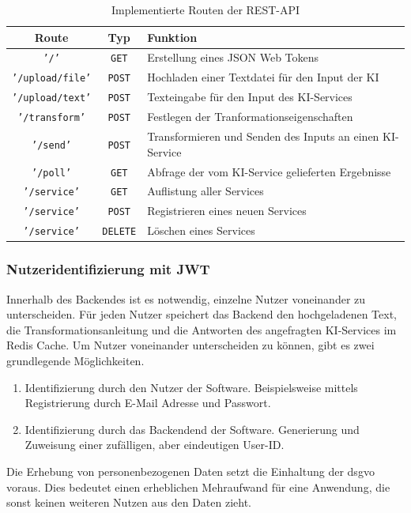 \begin{table}[H]
\centering
\begin{tabular}{c|c|l}
\textbf{Route} & \textbf{Typ} & \textbf{Funktion}\\
\hline
\texttt{'/'} & \texttt{GET} & Erstellung eines JSON Web Tokens\\
\hline
\texttt{'/upload/file'}  & \texttt{POST} & Hochladen einer Textdatei für den Input der KI \\
\texttt{'/upload/text'}  & \texttt{POST} & Texteingabe für den Input des KI-Services \\    
\texttt{'/transform'}  & \texttt{POST} & Festlegen der Tranformationseigenschaften\\ 
\texttt{'/send'}  & \texttt{POST} & Transformieren und Senden des Inputs an einen KI-Service \\ 
\texttt{'/poll'}  & \texttt{GET} & Abfrage der vom KI-Service gelieferten Ergebnisse \\ 
\hline
\texttt{'/service'}  & \texttt{GET} & Auflistung aller Services \\
\texttt{'/service'}  & \texttt{POST} & Registrieren eines neuen Services \\ 
\texttt{'/service'}  & \texttt{DELETE} & Löschen eines Services \\       
\end{tabular}
\caption{Implementierte Routen der REST-API}
\end{table}

\subsubsection{Nutzeridentifizierung mit JWT}
Innerhalb des Backendes ist es notwendig, einzelne Nutzer voneinander zu unterscheiden. Für jeden Nutzer speichert das Backend den hochgeladenen Text, die Transformationsanleitung und die Antworten des angefragten KI-Services im Redis Cache. Um Nutzer voneinander unterscheiden zu können, gibt es zwei grundlegende Möglichkeiten. 
\begin{enumerate}
\item Identifizierung durch den Nutzer der Software. Beispielsweise mittels Registrierung durch E-Mail Adresse und Passwort.
\item Identifizierung durch das Backendend der Software. Generierung und Zuweisung einer zufälligen, aber eindeutigen User-ID.
\end{enumerate}

Die Erhebung von personenbezogenen Daten setzt die Einhaltung der \ac{dsgvo} voraus. Dies bedeutet einen erheblichen Mehraufwand für eine Anwendung, die sonst keinen weiteren Nutzen aus den Daten zieht.

